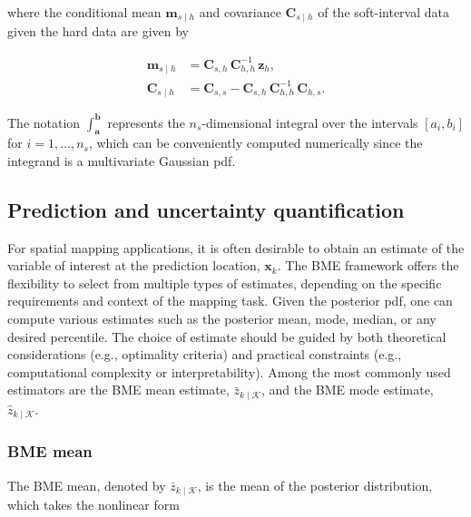 where the conditional mean \(\boldsymbol{m}_{s \mid h}\) and covariance \(\boldsymbol{C}_{s \mid h}\) of the soft-interval data given the hard data are given by

\vspace{-2em}

\begin{align}
\boldsymbol{m}_{s \mid h} &= \boldsymbol{C}_{s,h} \, \boldsymbol{C}^{-1}_{h,h} \, \boldsymbol{z}_{h},
\label{eq:m-zsh}\\
\boldsymbol{C}_{s \mid h} &= \boldsymbol{C}_{s,s} - \boldsymbol{C}_{s,h} \, \boldsymbol{C}^{-1}_{h,h} \, \boldsymbol{C}_{h,s}.
\label{eq:C-zsh}
\end{align}

The notation \(\int_{\boldsymbol{a}}^{\boldsymbol{b}}\) represents the \(n_s\)-dimensional integral over the intervals \([a_i, b_i]\) for \(i = 1, \ldots, n_s\), which can be conveniently computed numerically since the integrand is a multivariate Gaussian pdf.

\subsection{Prediction and uncertainty quantification}\label{prediction-and-uncertainty-quantification}

For spatial mapping applications, it is often desirable to obtain an estimate of the variable of interest at the prediction location, \(\boldsymbol{x}_k\). The BME framework offers the flexibility to select from multiple types of estimates, depending on the specific requirements and context of the mapping task. Given the posterior pdf, one can compute various estimates such as the posterior mean, mode, median, or any desired percentile. The choice of estimate should be guided by both theoretical considerations (e.g., optimality criteria) and practical constraints (e.g., computational complexity or interpretability). Among the most commonly used estimators are the BME mean estimate, \(\bar{z}_{k \mid \mathcal{K}}\), and the BME mode estimate, \(\hat{z}_{k \mid \mathcal{K}}\).

\subsubsection{BME mean}\label{bme-mean}

The BME mean, denoted by \(\bar{z}_{k \mid \mathcal{K}}\), is the mean of the posterior distribution, which takes the nonlinear form \citep{christakos2000modern}

